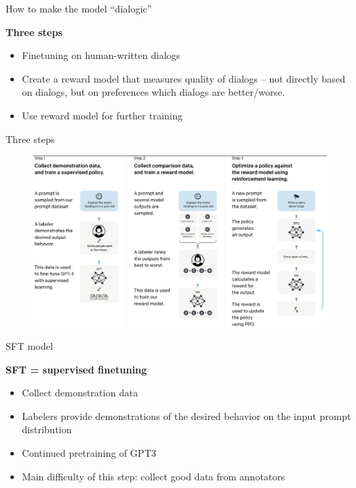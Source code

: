 \begin{vbframe}{How to make the model ``dialogic''}

\vfill

\textbf{Three steps}

	\begin{itemize}
		\item Finetuning on human-written dialogs
                \item Create a reward model that measures
		quality of dialogs -- not directly based on dialogs,
		but on preferences which dialogs are
		better/worse.
                \item Use reward model for further training
	\end{itemize}

\vfill

\end{vbframe}


\begin{vbframe}{Three steps}


\begin{figure}
\centering
\includegraphics[width = 12cm]{figure/threesteps.png}
\end{figure}


\end{vbframe}

\begin{vbframe}{SFT model}

\vfill

\textbf{SFT = supervised finetuning}

	\begin{itemize}
	\item Collect demonstration data
        \item Labelers provide demonstrations of the
          desired behavior on the input prompt distribution
\item Continued pretraining of GPT3
\item Main difficulty of this step: collect good data from annotators                  
	\end{itemize}

\vfill

\end{vbframe}

